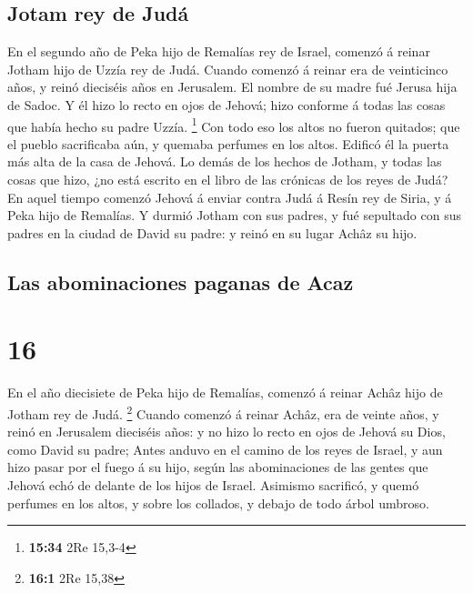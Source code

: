 \hypertarget{jotam-rey-de-juduxe1}{%
\subsection{Jotam rey de Judá}\label{jotam-rey-de-juduxe1}}

 En el segundo año de Peka hijo de Remalías rey de Israel,
comenzó á reinar Jotham hijo de Uzzía rey de Judá.  Cuando
comenzó á reinar era de veinticinco años, y reinó dieciséis años en
Jerusalem. El nombre de su madre fué Jerusa hija de Sadoc. 
Y él hizo lo recto en ojos de Jehová; hizo conforme á todas las cosas
que había hecho su padre Uzzía. \footnote{\textbf{15:34} 2Re 15,3-4}
 Con todo eso los altos no fueron quitados; que el pueblo
sacrificaba aún, y quemaba perfumes en los altos. Edificó él la puerta
más alta de la casa de Jehová.  Lo demás de los hechos de
Jotham, y todas las cosas que hizo, ¿no está escrito en el libro de las
crónicas de los reyes de Judá?  En aquel tiempo comenzó
Jehová á enviar contra Judá á Resín rey de Siria, y á Peka hijo de
Remalías.  Y durmió Jotham con sus padres, y fué sepultado
con sus padres en la ciudad de David su padre: y reinó en su lugar Achâz
su hijo.

\hypertarget{las-abominaciones-paganas-de-acaz}{%
\subsection{Las abominaciones paganas de
Acaz}\label{las-abominaciones-paganas-de-acaz}}

\hypertarget{section-15}{%
\section{16}\label{section-15}}

 En el año diecisiete de Peka hijo de Remalías, comenzó á
reinar Achâz hijo de Jotham rey de Judá. \footnote{\textbf{16:1} 2Re
  15,38}  Cuando comenzó á reinar Achâz, era de veinte años,
y reinó en Jerusalem dieciséis años: y no hizo lo recto en ojos de
Jehová su Dios, como David su padre;  Antes anduvo en el
camino de los reyes de Israel, y aun hizo pasar por el fuego á su hijo,
según las abominaciones de las gentes que Jehová echó de delante de los
hijos de Israel.  Asimismo sacrificó, y quemó perfumes en
los altos, y sobre los collados, y debajo de todo árbol umbroso.

